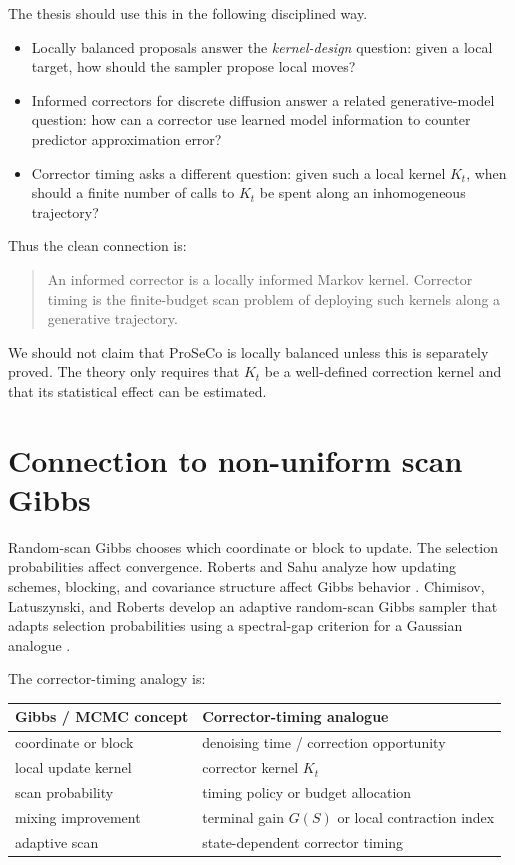 \documentclass[11pt]{article}
\newcommand{\1}{\mathbf 1}
\begin{document}
The thesis should use this in the following disciplined way.

\begin{itemize}[leftmargin=1.5em]
\item Locally balanced proposals answer the \emph{kernel-design} question:
given a local target, how should the sampler propose local moves?
\item Informed correctors for discrete diffusion answer a related
generative-model question: how can a corrector use learned model information
to counter predictor approximation error?
\item Corrector timing asks a different question: given such a local kernel
\(K_t\), when should a finite number of calls to \(K_t\) be spent along an
inhomogeneous trajectory?
\end{itemize}

Thus the clean connection is:

\begin{quote}
An informed corrector is a locally informed Markov kernel.  Corrector timing is
the finite-budget scan problem of deploying such kernels along a generative
trajectory.
\end{quote}

We should not claim that ProSeCo is locally balanced unless this is separately
proved.  The theory only requires that \(K_t\) be a well-defined correction
kernel and that its statistical effect can be estimated.

\section{Connection to non-uniform scan Gibbs}

Random-scan Gibbs chooses which coordinate or block to update.  The selection
probabilities affect convergence.  Roberts and Sahu analyze how updating
schemes, blocking, and covariance structure affect Gibbs behavior
\cite{roberts1997updating}.  Chimisov, Latuszynski, and Roberts develop an
adaptive random-scan Gibbs sampler that adapts selection probabilities using a
spectral-gap criterion for a Gaussian analogue \cite{chimisov2018adapting}.

The corrector-timing analogy is:

\begin{center}
\begin{tabular}{ll}
\toprule
Gibbs / MCMC concept & Corrector-timing analogue \\
\midrule
coordinate or block & denoising time / correction opportunity \\
local update kernel & corrector kernel \(K_t\) \\
scan probability & timing policy or budget allocation \\
mixing improvement & terminal gain \(G(S)\) or local contraction index \\
adaptive scan & state-dependent corrector timing \\
\bottomrule
\end{tabular}
\end{center}
\end{document}
